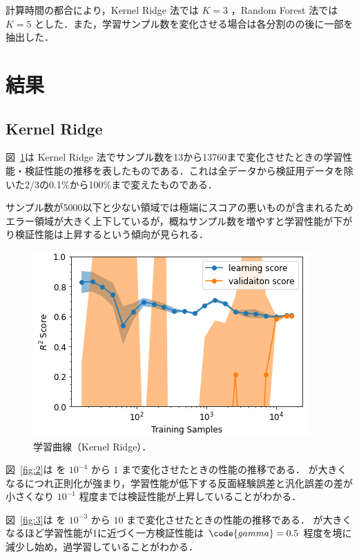\documentclass[10pt,a4paper,dvipdfmx]{jsarticle}
\begin{document}
計算時間の都合により，Kernel Ridge 法では $K=3$ ，Random Forest 法では $K=5$ とした．また，学習サンプル数を変化させる場合は各分割のの後に一部を抽出した．

\section{結果}

\subsection{Kernel Ridge}

図~\ref{fig:1}は Kernel Ridge 法でサンプル数を13から13760まで変化させたときの学習性能・検証性能の推移を表したものである．これは全データから検証用データを除いた2/3の0.1\%から100\%まで変えたものである．

サンプル数が5000以下と少ない領域では極端にスコアの悪いものが含まれるためエラー領域が大きく上下しているが，概ねサンプル数を増やすと学習性能が下がり検証性能は上昇するという傾向が見られる．

\begin{figure}[ht]
   \centering
   \includegraphics[keepaspectratio, width=0.45\linewidth]{2021-07-28-00-40-53.png}
   \caption{学習曲線（Kernel Ridge）．}
   \label{fig:1}
\end{figure}

図~\ref{fig:2}は  を $10^{-4}$ から $1$ まで変化させたときの性能の推移である． が大きくなるにつれ正則化が強まり，学習性能が低下する反面経験誤差と汎化誤差の差が小さくなり $10^{-1}$ 程度までは検証性能が上昇していることがわかる．

図~\ref{fig:3}は  を $10^{-3}$ から $10$ まで変化させたときの性能の推移である．  が大きくなるほど学習性能が1に近づく一方検証性能は $\code{gamma}=0.5$ 程度を境に減少し始め，過学習していることがわかる．
\end{document}

